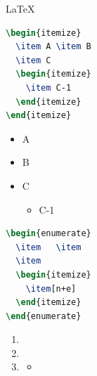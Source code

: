 \documentclass{article}
\begin{document}
\begin{frame}[fragile]{\LaTeX{}  }
    \begin{minipage}{0.5\linewidth}
\begin{lstlisting}[language=TeX]
\begin{itemize}
  \item A \item B
  \item C
  \begin{itemize}
    \item C-1
  \end{itemize}
\end{itemize}
\end{lstlisting}
    \end{minipage}\hspace{1cm}
    \begin{minipage}{0.3\linewidth}
        \begin{itemize}
            \item A
            \item B
            \item C
            \begin{itemize}
                \item C-1
            \end{itemize}
        \end{itemize}
    \end{minipage}
    \medskip
    \pause
    \begin{minipage}{0.5\linewidth}
\begin{lstlisting}[language=TeX]
\begin{enumerate}
  \item   \item  
  \item  
  \begin{itemize}
    \item[n+e]  
  \end{itemize}
\end{enumerate}
\end{lstlisting}
    \end{minipage}\hspace{1cm}
    \begin{minipage}{0.3\linewidth}
        \begin{enumerate}
            \item  
            \item  
            \item  
            \begin{itemize}
                \item[n+e]  
            \end{itemize}
        \end{enumerate}
    \end{minipage}
\end{frame}
\end{document}
